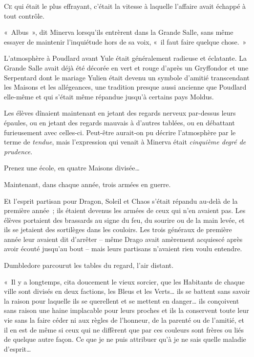

\lettrine{C}{e} qui était le plus effrayant, c'était la vitesse à laquelle l'affaire avait échappé à tout contrôle.

«~Albus~», dit Minerva lorsqu'ils entrèrent dans la Grande Salle, sans même essayer de maintenir l'inquiétude hors de sa voix, «~il faut faire quelque chose.~»

L'atmosphère à Poudlard avant Yule était généralement radieuse et éclatante.
La Grande Salle avait déjà été décorée en vert et rouge d'après un Gryffondor et une Serpentard dont le mariage Yulien était devenu un symbole d'amitié transcendant les Maisons et les allégeances, une tradition presque aussi ancienne que Poudlard elle-même et qui s'était même répandue jusqu'à certains pays Moldus.

Les élèves dînaient maintenant en jetant des regards nerveux par-dessus leurs épaules, ou en jetant des regards mauvais à d'autres tablées, ou en débattant furieusement avec celles-ci.
Peut-être aurait-on pu décrire l'atmosphère par le terme de \emph{tendue}, mais l'expression qui venait à Minerva était \emph{cinquième degré de prudence}.

Prenez une école, en quatre Maisons divisée…

Maintenant, dans chaque année, trois armées en guerre.

Et l'esprit partisan pour Dragon, Soleil et Chaos s'était répandu au-delà de la première année~; ils étaient devenus les armées de ceux qui n'en avaient pas.
Les élèves portaient des brassards au signe du feu, du sourire ou de la main levée, et ils se jetaient des sortilèges dans les couloirs.
Les trois généraux de première année leur avaient dit d'arrêter -- même Drago avait amèrement acquiescé après avoir écouté jusqu'au bout -- mais leurs partisans n'avaient rien voulu entendre.

Dumbledore parcourut les tables du regard, l'air distant.

«~Il y a longtemps, cita doucement le vieux sorcier, que les Habitants de chaque ville sont divisés en deux factions, les Bleus et les Verts… ils se battent sans savoir la raison pour laquelle ils se querellent et se mettent en danger… ils conçoivent sans raison une haine implacable pour leurs proches et ils la conservent toute leur vie sans la faire céder ni aux règles de l'honneur, de la parenté ou de l'amitié, et il en est de même si ceux qui ne diffèrent que par ces couleurs sont frères ou liés de quelque autre façon.
Ce que je ne puis attribuer qu'à je ne sais quelle maladie d'esprit…

